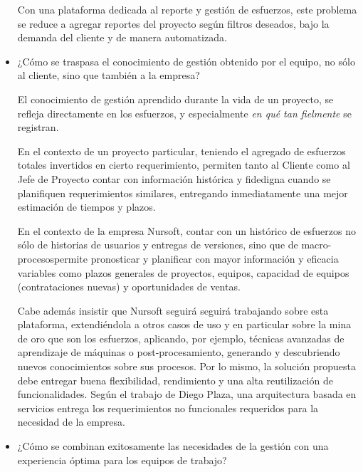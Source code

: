 \begin{itemize}
  Con una plataforma dedicada al reporte y gestión de esfuerzos, este problema se reduce a
  agregar reportes del proyecto según filtros deseados, bajo la demanda del
  cliente y de manera automatizada.
  \item ¿Cómo se traspasa el conocimiento de gestión obtenido por el equipo, no sólo al cliente,
  sino que también a la empresa?

  El conocimiento de gestión aprendido durante la vida de un proyecto, se refleja
  directamente en los esfuerzos, y especialmente \textit{en qué tan fielmente} se registran.

  En el contexto de un proyecto particular, teniendo el agregado de esfuerzos totales
  invertidos en cierto requerimiento, permiten tanto al Cliente como al Jefe de Proyecto
  contar con información histórica y fidedigna cuando se planifiquen requerimientos similares,
  entregando inmediatamente una mejor estimación de tiempos y plazos.

  En el contexto de la empresa Nursoft, contar con un histórico de esfuerzos no sólo de historias
  de usuarios y entregas de versiones, sino que de macro-procesos\footnotemark[4] permite pronosticar y
  planificar con mayor información y eficacia variables como plazos generales de proyectos,
  equipos, capacidad de equipos (contrataciones nuevas) y oportunidades de ventas.

  Cabe además insistir que Nursoft seguirá seguirá trabajando sobre esta plataforma,
  extendiéndola a otros casos de uso y en particular sobre la mina de oro que son los esfuerzos, aplicando,
  por ejemplo, técnicas avanzadas de aprendizaje de máquinas o post-procesamiento,
  generando y descubriendo nuevos conocimientos sobre sus procesos.
  Por lo mismo, la solución propuesta debe entregar buena flexibilidad, rendimiento
  y una alta reutilización de funcionalidades. Según el trabajo de Diego Plaza\cite{plaza_2015},
  una arquitectura basada en servicios entrega los requerimientos no funcionales requeridos para la necesidad de la empresa.
  
  
  \item ¿Cómo se combinan exitosamente las necesidades de la gestión con una
  experiencia óptima para los equipos de trabajo?
  

\end{itemize}
